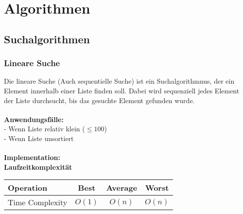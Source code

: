 \documentclass[../main.tex]{subfiles}
\begin{document}
	
	\section{Algorithmen}

	\subsection{Suchalgorithmen}
	\subsubsection{Lineare Suche}
	Die lineare Suche (Auch sequentielle Suche) ist ein Suchalgorithmnus, der ein Element innerhalb einer Liste finden soll.
	Dabei wird sequenziell jedes Element der Liste durchsucht, bis das gesuchte Element gefunden wurde.\\\\
	\textbf{Anwendungsfälle:}\\
		- Wenn Liste relativ klein ($\leq100$)\\
		- Wenn Liste unsortiert\\\\
	\textbf{Implementation:}\\
	 
	\textbf{Laufzeitkomplexität}\\
	\begin{table}[ht]
		\centering
		\begin{tabular}{l *{3}{c}}
			\toprule
			Operation & Best & Average & Worst\\
			\midrule
			Time Complexity & $O(1)$ & $O(n)$ & $O(n)$\\
			\bottomrule
		\end{tabular}
	\end{table}
	\clearpage
	
\end{document}
